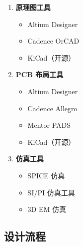 \begin{enumerate}
  \item \textbf{原理图工具}
    \begin{itemize}
      \item Altium Designer
      \item Cadence OrCAD
      \item KiCad（开源）
    \end{itemize}

  \item \textbf{PCB 布局工具}
    \begin{itemize}
      \item Altium Designer
      \item Cadence Allegro
      \item Mentor PADS
      \item KiCad（开源）
    \end{itemize}

  \item \textbf{仿真工具}
    \begin{itemize}
      \item SPICE 仿真
      \item SI/PI 仿真工具
      \item 3D EM 仿真
    \end{itemize}
\end{enumerate}

\subsection{设计流程}

